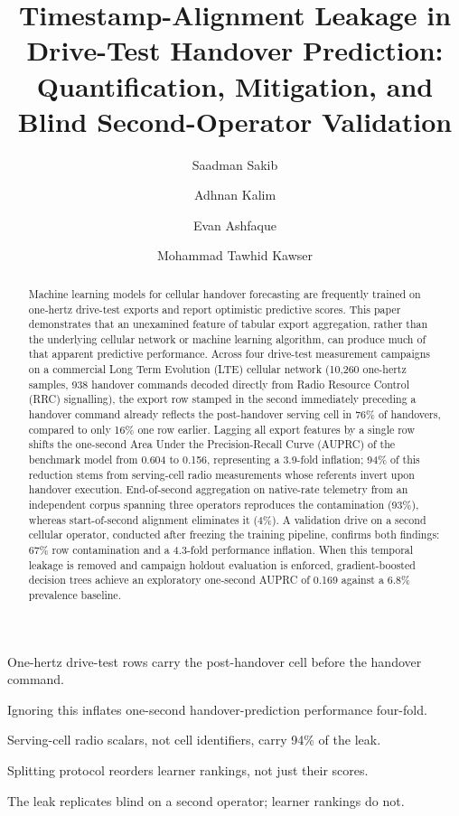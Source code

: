 \documentclass[preprint,review,12pt]{elsarticle}\usepackage{lineno}\linenumbers
\begin{document}
\begin{frontmatter}

\title{Timestamp-Alignment Leakage in Drive-Test Handover Prediction: Quantification, Mitigation, and Blind Second-Operator Validation}

\author[iut]{Saadman Sakib}
\author[iut]{Adhnan Kalim}
\author[iut]{Evan Ashfaque}
\author[iut]{Mohammad Tawhid Kawser}

\begin{abstract}
Machine learning models for cellular handover forecasting are frequently trained on one-hertz drive-test exports and report optimistic predictive scores. This paper demonstrates that an unexamined feature of tabular export aggregation, rather than the underlying cellular network or machine learning algorithm, can produce much of that apparent predictive performance. Across four drive-test measurement campaigns on a commercial Long Term Evolution (LTE) cellular network (10,260 one-hertz samples, 938 handover commands decoded directly from Radio Resource Control (RRC) signalling), the export row stamped in the second immediately preceding a handover command already reflects the post-handover serving cell in 76\% of handovers, compared to only 16\% one row earlier. Lagging all export features by a single row shifts the one-second Area Under the Precision-Recall Curve (AUPRC) of the benchmark model from 0.604 to 0.156, representing a 3.9-fold inflation; 94\% of this reduction stems from serving-cell radio measurements whose referents invert upon handover execution. End-of-second aggregation on native-rate telemetry from an independent corpus spanning three operators reproduces the contamination (93\%), whereas start-of-second alignment eliminates it (4\%). A validation drive on a second cellular operator, conducted after freezing the training pipeline, confirms both findings: 67\% row contamination and a 4.3-fold performance inflation. When this temporal leakage is removed and campaign holdout evaluation is enforced, gradient-boosted decision trees achieve an exploratory one-second AUPRC of 0.169 against a 6.8\% prevalence baseline.
\end{abstract}

\begin{highlights}
\item One-hertz drive-test rows carry the post-handover cell before the handover command.
\item Ignoring this inflates one-second handover-prediction performance four-fold.
\item Serving-cell radio scalars, not cell identifiers, carry 94\% of the leak.
\item Splitting protocol reorders learner rankings, not just their scores.
\item The leak replicates blind on a second operator; learner rankings do not.
\end{highlights}


\end{frontmatter}
\end{document}

